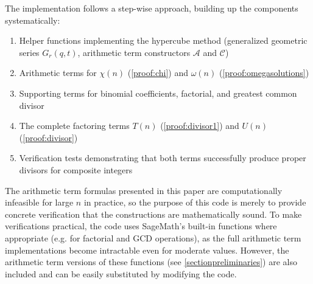 \documentclass[10pt]{article}
\theoremstyle{plain}
\begin{document}
The implementation follows a step-wise approach, building up the components systematically:
\begin{enumerate}
\item Helper functions implementing the hypercube method (generalized geometric series $G_r(q,t)$, arithmetic term constructors $\mathcal{A}$ and $\mathcal{C}$)
\item Arithmetic terms for $\chi(n)$ (\cref{proof:chi}) and $\omega(n)$ (\cref{proof:omegasolutions})
\item Supporting terms for binomial coefficients, factorial, and greatest common divisor
\item The complete factoring terms $T(n)$ (\cref{proof:divisor1}) and $U(n)$ (\cref{proof:divisor})
\item Verification tests demonstrating that both terms successfully produce proper divisors for composite integers
\end{enumerate}

The arithmetic term formulas presented in this paper are computationally infeasible for large $n$ in practice, so the purpose of this code is merely to provide concrete verification that the constructions are mathematically sound. To make verifications practical, the code uses SageMath's built-in functions where appropriate (e.g. for factorial and GCD operations), as the full arithmetic term implementations become intractable even for moderate values. However, the arithmetic term versions of these functions (see \cref{sectionpreliminaries}) are also included and can be easily substituted by modifying the code.
\end{document}
